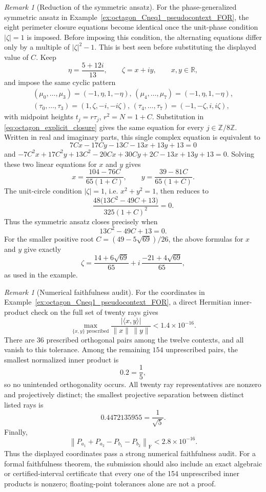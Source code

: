\documentclass[
  twocolumn,
  aps,
  pra,
  floatfix,
  amsmath,amssymb,
  longbibliography
]{revtex4-2}
\theoremstyle{definition}
\theoremstyle{remark}
\newtheorem{remark}[theorem]{Remark}
\begin{document}
\begin{remark}[Reduction of the symmetric ansatz]
For the phase-generalized symmetric ansatz in
Example~\ref{ex:octagon_Cneq1_pseudocontext_FOR}, the eight perimeter
closure equations become identical once the unit-phase condition
\(|\zeta|=1\) is imposed.  Before imposing this condition, the
alternating equations differ only by a multiple of
\(|\zeta|^2-1\).  This is best seen before substituting
the displayed value of \(C\).  Keep
\[
  \eta=\frac{5+12i}{13},
  \qquad
  \zeta=x+iy,
  \qquad x,y\in\mathbb R,
\]
and impose the same cyclic pattern
\[
\begin{gathered}
  (\mu_0,\ldots,\mu_3)=(-1,\eta,1,-\eta),
  \,
  (\mu_4,
  \ldots,\mu_7)=(-1,\eta,1,-\eta),\\
  (\tau_0,\ldots,\tau_3)=(1,\zeta,-i,-i\zeta),
  \,
  (\tau_4,\ldots,\tau_7)=(-1,-\zeta,i,i\zeta),
\end{gathered}
\]
with midpoint heights \(t_j=r\tau_j\), \(r^2=N=1+C\).  Substitution in
\eqref{eq:octagon_explicit_closure} gives the same equation for every
\(j\in\mathbb Z/8\mathbb Z\).  Written in real and imaginary parts, this
single complex equation is equivalent to
\[
  7Cx-17Cy-13C-13x+13y+13=0
\]
and
\(
  -7C^2x+17C^2y+13C^2
  -20Cx+30Cy+2C-13x+13y+13=0 .
\)
Solving these two linear equations for \(x\) and \(y\) gives
\[
  x=\frac{104-76C}{65(1+C)},
  \qquad
  y=\frac{39-81C}{65(1+C)} .
\]
The unit-circle condition \(|\zeta|=1\), i.e. \(x^2+y^2=1\), then reduces
to
\[
  \frac{48\bigl(13C^2-49C+13\bigr)}{325(1+C)^2}=0 .
\]
Thus the symmetric ansatz closes precisely when
\[
  13C^2-49C+13=0 .
\]
For the smaller positive root \(C=(49-5\sqrt{69})/26\), the above
formulas for \(x\) and \(y\) give exactly
\[
  \zeta=
  \frac{14+6\sqrt{69}}{65}
  +i\,\frac{-21+4\sqrt{69}}{65},
\]
as used in the example.
\end{remark}

\begin{remark}[Numerical faithfulness audit]
For the coordinates in Example~\ref{ex:octagon_Cneq1_pseudocontext_FOR},
a direct Hermitian inner-product check on the full set of twenty rays gives
\[
  \max_{\{x,y\}\text{ prescribed}}
  \frac{|\langle x,y\rangle|}{\|x\|\,\|y\|}
  <1.4\times10^{-16}.
\]
There are \(36\) prescribed orthogonal pairs among the twelve contexts,
and all vanish to this tolerance.  Among the remaining \(154\)
unprescribed pairs, the smallest normalized inner product is
\[
  0.2=\frac15,
\]
so no unintended orthogonality occurs.  All twenty ray representatives
are nonzero and projectively distinct; the smallest projective separation
between distinct listed rays is
\[
  0.4472135955=\frac1{\sqrt5}.
\]
Finally,
\[
  \left\|
  P_{a_1}+P_{a_2}-P_{b_1}-P_{b_2}
  \right\|_{\mathrm F}
  <2.8\times10^{-16}.
\]
Thus the displayed coordinates pass a strong numerical faithfulness audit.
For a formal faithfulness theorem, the submission should also include an
exact algebraic or certified-interval certificate that every one of the
154 unprescribed inner products is nonzero; floating-point tolerances
alone are not a proof.
\end{remark}
\end{document}
